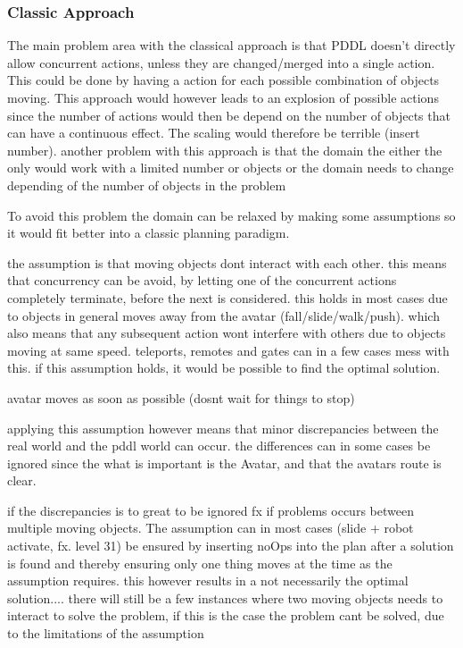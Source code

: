 		
		
		\subsubsection{Classic Approach}
		The main problem area with the classical approach is that PDDL doesn't directly allow concurrent actions, unless they are changed/merged into a single action. This could be done by having a action for each possible combination of objects moving. This approach would however leads to an explosion of possible actions since the number of actions would then be depend on the number of objects that can have a continuous effect. The scaling would therefore be terrible (insert number). another problem with this approach is that the domain the either the only would work with a limited number or objects or the domain needs to change depending of the number of objects in the problem
		
		
		To avoid this problem the domain can be relaxed by making some assumptions so it would fit better into a classic planning paradigm. 
		
		the assumption is that moving objects dont interact with each other. this means that concurrency can be avoid, by letting one of the concurrent actions completely terminate, before the next is considered. %
		this holds in most cases due to objects in general moves away from the avatar (fall/slide/walk/push). which also means that any subsequent action wont interfere with others due to objects moving at same speed. teleports, remotes and gates can in a few cases mess with this. if this assumption holds, it would be possible to find the optimal solution.
		
		
		avatar moves as soon as possible (dosnt wait for things to stop)
		
		applying this assumption however means that minor discrepancies between the real world and the pddl world can occur. the differences can in some cases be ignored since the what is important is the Avatar, and that the avatars route is clear. 
 
		if the discrepancies is to great to be ignored fx if problems occurs between multiple moving objects. The assumption can in most cases (slide + robot activate, fx. level 31) be ensured by inserting noOps into the plan after a solution is found and thereby ensuring only one thing moves at the time as the assumption requires. this however results in a not necessarily the optimal solution.... there will still be a few instances where two moving objects needs to interact to solve the problem, if this is the case the problem cant be solved, due to the limitations of the assumption
			
